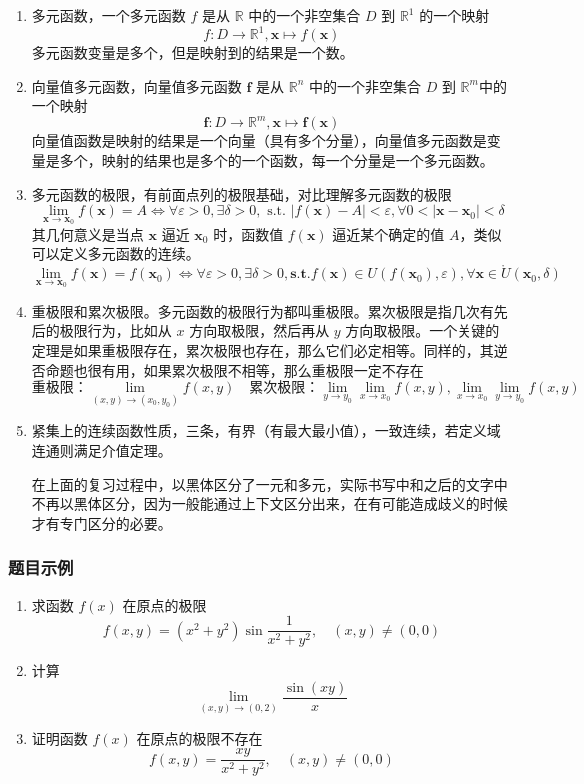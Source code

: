 \begin{enumerate}
\item 多元函数，一个多元函数 $f$ 是从 $\mathbb{R}$ 中的一个非空集合 $D$ 到 $\mathbb{R}^1$ 的一个映射
$$
f:D \to \mathbb{R}^1, \mathbf{x} \mapsto f(\mathbf{x})
$$
多元函数变量是多个，但是映射到的结果是一个数。

\item 向量值多元函数，向量值多元函数 $\mathbf{f}$ 是从 $\mathbb{R}^n$ 中的一个非空集合 $D$ 到 $\mathbb{R}^m$中的一个映射
$$
\mathbf{f}:D \to \mathbb{R}^m, \mathbf{x} \mapsto \mathbf{f}(\mathbf{x})
$$
向量值函数是映射的结果是一个向量（具有多个分量），向量值多元函数是变量是多个，映射的结果也是多个的一个函数，每一个分量是一个多元函数。

\item 多元函数的极限，有前面点列的极限基础，对比理解多元函数的极限
$$
\lim_{\mathbf{x} \to \mathbf{x}_0} f(\mathbf{x}) = A
\Leftrightarrow
\forall \varepsilon>0,\exists \delta>0,\text{ s.t. }|f(\mathbf{x})-A|< \varepsilon,\forall 0<|\mathbf{x}-\mathbf{x}_0|<\delta
$$
其几何意义是当点 $\mathbf{x}$ 逼近 $\mathbf{x}_0$ 时，函数值 $f(\mathbf{x})$ 逼近某个确定的值 $A$，类似可以定义多元函数的连续。
$$
\lim_{\mathbf{x} \to \mathbf{x}_0} f(\mathbf{x}) = f(\mathbf{x}_0)
\Leftrightarrow
\forall \varepsilon>0,\exists \delta>0,\textbf{s.t.}f(\mathbf{x})\in U(f(\mathbf{x}_0),\varepsilon),\forall \mathbf{x} \in \mathring{U}(\mathbf{x}_{0},\delta)
$$

\item 重极限和累次极限。多元函数的极限行为都叫重极限。累次极限是指几次有先后的极限行为，比如从 $x$ 方向取极限，然后再从 $y$ 方向取极限。一个关键的定理是如果重极限存在，累次极限也存在，那么它们必定相等。同样的，其逆否命题也很有用，如果累次极限不相等，那么重极限一定不存在
$$
\text{重极限：} \lim_{(x,y) \to (x_0,y_0)} f(x,y) \quad \text{累次极限：} \lim_{y \to y_0}\lim_{x \to x_0} f(x,y) ,\lim_{x \to x_0}\lim_{y \to y_0} f(x,y) 
$$

\item 紧集上的连续函数性质，三条，有界（有最大最小值），一致连续，若定义域连通则满足介值定理。

在上面的复习过程中，以黑体区分了一元和多元，实际书写中和之后的文字中不再以黑体区分，因为一般能通过上下文区分出来，在有可能造成歧义的时候才有专门区分的必要。
\end{enumerate}

\subsubsection{题目示例}
\begin{enumerate}
\item 求函数 $f(x)$ 在原点的极限
$$
f(x,y)=(x^2+y^2)\sin\frac1{x^2+y^2},\quad(x,y)\neq(0,0)
$$

\item 计算
$$
\lim_{(x,y)\to(0,2)}\frac{\sin(xy)}x
$$

\item 证明函数 $f(x)$ 在原点的极限不存在
$$
f(x,y)=\frac{xy}{x^2+y^2},\quad(x,y)\neq(0,0)
$$
\end{enumerate}

